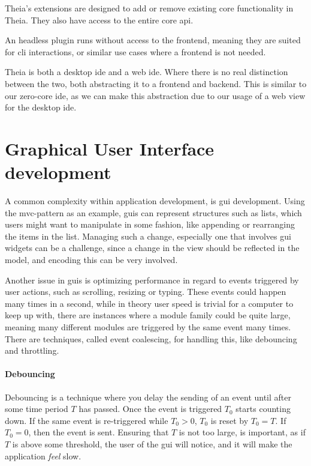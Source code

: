 Theia's extensions are designed to add or remove existing core functionality in
Theia. They also have access to the entire core \gls*{api}.

An headless plugin runs without access to the frontend, meaning they are suited
for \gls*{cli} interactions, or similar use cases where a frontend is not
needed.

Theia is both a desktop \gls*{ide} and a web \gls*{ide}. Where there is no real
distinction between the two, both abstracting it to a frontend and backend. This
is similar to our zero-core \gls*{ide}, as we can make this abstraction due to
our usage of a web view for the desktop \gls*{ide}.


\section{Graphical User Interface development} \label{sec:guid}

A common complexity within application development, is \gls*{gui} development.
Using the \gls*{mvc}-pattern as an example, \gls*{gui}s can represent structures
such as lists, which users might want to manipulate in some fashion, like
appending or rearranging the items in the list. Managing such a change,
especially one that involves \gls*{gui} widgets can be a challenge, since a
change in the view should be reflected in the model, and encoding this can be
very involved.

Another issue in \gls*{gui}s is optimizing performance in regard to events
triggered by user actions, such as scrolling, resizing or typing. These events
could happen many times in a second, while in theory user speed is trivial for a
computer to keep up with, there are instances where a module family could be
quite large, meaning many different modules are triggered by the same event many
times. There are techniques, called event coalescing, for handling this, like
debouncing and throttling.

\paragraph{Debouncing} Debouncing is a technique where you delay the sending of
an event until after some time period $T$ has passed. Once the event is triggered
$T_0$ starts counting down. If the same event is re-triggered while $T_0 > 0$,
$T_0$ is reset by $T_0 = T$. If $T_0 = 0$, then the event is sent. Ensuring that
$T$ is not too large, is important, as if $T$ is above some threshold, the user
of the \gls*{gui} will notice, and it will make the application \textit{feel}
slow.

